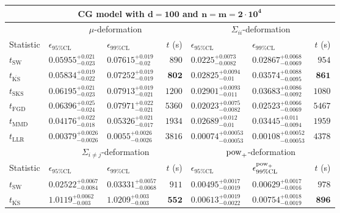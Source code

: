 \begin{tabular}{l|llr|llr}
	\toprule
	\multicolumn{7}{c}{{\bf CG model with $\mathbf{d=100}$ and $\mathbf{n=m=2\cdot 10^{4}}$}} \\
	\toprule
	\multicolumn{1}{c}{} & \multicolumn{3}{c}{$\mu$-deformation} & \multicolumn{3}{c}{$\Sigma_{ii}$-deformation} \\
	Statistic & $\epsilon_{95\%\mathrm{CL}}$ & $\epsilon_{99\%\mathrm    {CL}}$ & $t$ (s) & $\epsilon_{95\%\mathrm{CL}}$ & $\epsilon_{99\%\mathrm{CL}}$ & $t$ (s) \\
	\midrule
	$t_{\mathrm{SW}}$ & $0.05955_{-0.023}^{+0.021}$ & $0.07615_{-0.02}^{+0.019}$ & $890$ & $0.0225_{-0.0082}^{+0.0073}$ & $0.02867_{-0.0069}^{+0.0068}$ & $954$ \\
	$t_{\overline{\mathrm{KS}}}$ & $0.05834_{-0.022}^{+0.019}$ & $0.07252_{-0.019}^{+0.019}$ & ${\mathbf{802}}$ & $0.02825_{-0.01}^{+0.0094}$ & $0.03574_{-0.0095}^{+0.0088}$ & ${\mathbf{861}}$ \\
	$t_{\mathrm{SKS}}$ & $0.06195_{-0.023}^{+0.021}$ & $0.07913_{-0.021}^{+0.019}$ & $1200$ & $0.02901_{-0.011}^{+0.0093}$ & $0.03683_{-0.0092}^{+0.0086}$ & $1080$ \\
	$t_{\mathrm{FGD}}$ & $0.06396_{-0.024}^{+0.025}$ & $0.07971_{-0.021}^{+0.022}$ & $5360$ & ${\mathbf{0.02023_{-0.0082}^{+0.0075}}}$ & ${\mathbf{0.02523_{-0.0069}^{+0.0066}}}$ & $5467$ \\
	$t_{\mathrm{MMD}}$ & ${\mathbf{0.04176_{-0.018}^{+0.022}}}$ & ${\mathbf{0.05326_{-0.017}^{+0.021}}}$ & $1934$ & $0.02689_{-0.01}^{+0.012}$ & $0.03445_{-0.0094}^{+0.011}$ & $1959$ \\
	$t_{\mathrm{LLR}}$ & $0.00379_{-0.0026}^{+0.0026}$ & $0.0055_{-0.0026}^{+0.0026}$ & $3816$ & $0.00074_{-0.00053}^{+0.00053}$ & $0.00108_{-0.00053}^{+0.00052}$ & $4378$ \\
	\toprule
	\multicolumn{1}{c}{} & \multicolumn{3}{c}{$\Sigma_{i\neq j}$-deformation} & \multicolumn{3}{c}{$\rm{pow}_{+}$-deformation} \\
	Statistic & $\epsilon_{95\%\mathrm{CL}}$ & $\epsilon_{99\%\mathrm{CL}}$ & $t$ (s) & $\epsilon_{95\%\mathrm{CL}}$ & $\epsilon^{\rm   {pow}_{+}}_{99\%\mathrm{CL}}$ & $t$ (s) \\
	\midrule
	$t_{\mathrm{SW}}$ & $0.02522_{-0.0084}^{+0.0067}$ & $0.03331_{-0.0068}^{+0.0057}$ & $911$ & $0.00495_{-0.0019}^{+0.0017}$ & $0.00629_{-0.0016}^{+0.0017}$ & $978$ \\
	$t_{\overline{\mathrm{KS}}}$ & $1.0119_{-0.003}^{+0.0062}$ & $1.0209_{-0.003}^{+0.003}$ & ${\mathbf{552}}$ & $0.00613_{-0.0022}^{+0.0019}$ & $0.00754_{-0.0019}^{+0.0018}$ & ${\mathbf{896}}$ \\

\end{tabular}
